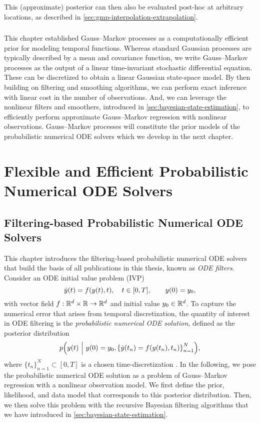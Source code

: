 \documentclass{mimosis}
\begin{document}
This (approximate) posterior can then also be evaluated post-hoc at arbitrary locations, as described in \cref{sec:gmp-interpolation-extrapolation}.
\section{\wrapupsec{}}
\label{sec:orge0d45f0}
This chapter established Gauss--Markov processes as a computationally efficient prior for modeling temporal functions.
Whereas standard Gaussian processes are typically described by a mean and covariance function, we write Gauss--Markov processes as the output of a linear time-invariant stochastic differential equation.
These can be discretized to obtain a linear Gaussian state-space model.
By then building on filtering and smoothing algorithms, we can perform exact inference with linear cost in the number of observations.
And, we can leverage the nonlinear filters and smoothers, introduced in
\cref{sec:bayesian-state-estimation},
to efficiently perform approximate Gauss--Markov regression with nonlinear observations.
Gauss--Markov processes will constitute the prior models of the probabilistic numerical ODE solvers which we develop in the next chapter.
\part{Flexible and Efficient Probabilistic Numerical ODE Solvers}
\label{part:odefilters}
\chapter{Filtering-based Probabilistic Numerical ODE Solvers}
\label{sec:orga57b557}
\label{sec:ode-filters}
\label{sec:odefilters}

This chapter introduces the filtering-based probabilistic numerical ODE solvers that build the basis of all publications in this thesis, known as \emph{ODE filters}.
Consider an ODE initial value problem (IVP)
\begin{equation}
  \label{eq:ivp}
  \dot{\val}(t) = \vf(\val(t), t), \quad t \in [0, T], \qquad \val(0) = \val_0,
\end{equation}
with vector field
\(\vf: \mathbb{R}^d \times \mathbb{R} \to \mathbb{R}^d\)
and initial value
\(y_0 \in \mathbb{R}^d\).
To capture the numerical error that arises from temporal discretization, the quantity of interest in ODE filtering is the \emph{probabilistic numerical ODE solution}, defined as the posterior distribution
\begin{equation}
  \label{eq:pnsol}
  \p( \val(t) ~\Big|~ \val(0) = \val_0, \left\{ \dot{\val}(t_n) = \vf(\val(t_n), t_n) \right\}_{n=1}^N ),
\end{equation}
where
\(\{t_n\}_{n=1}^N \subset [0, T]\) is a chosen time-discretization
\parencite{tronarp18_probab_solut_to_ordin_differ}.
In the following, we pose the probabilistic numerical ODE solution as a problem of Gauss--Markov regression with a nonlinear observation model.
We first
define the prior, likelihood, and data model that corresponds to this posterior distribution.
Then, we then solve this problem with the recursive Bayesian filtering algorithms that we have introduced in
\cref{sec:bayesian-state-estimation}.
\end{document}
